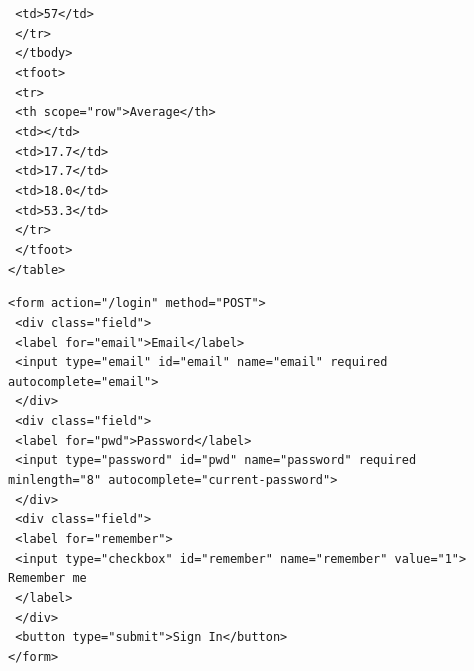 \documentclass[11pt]{article}
\begin{document}
\begin{corrige}[Exercise 4]
\texttt{      <td>57</td>}\\
\texttt{    </tr>}\\
\texttt{  </tbody>}\\
\texttt{  <tfoot>}\\
\texttt{    <tr>}\\
\texttt{      <th scope="row">Average</th>}\\
\texttt{      <td></td>}\\
\texttt{      <td>17.7</td>}\\
\texttt{      <td>17.7</td>}\\
\texttt{      <td>18.0</td>}\\
\texttt{      <td>53.3</td>}\\
\texttt{    </tr>}\\
\texttt{  </tfoot>}\\
\texttt{</table>}
\end{corrige}

\begin{corrige}[Exercise 5]
\texttt{<form action="/login" method="POST">}\\
\texttt{  <div class="field">}\\
\texttt{    <label for="email">Email</label>}\\
\texttt{    <input type="email" id="email" name="email" required autocomplete="email">}\\
\texttt{  </div>}\\
\texttt{  <div class="field">}\\
\texttt{    <label for="pwd">Password</label>}\\
\texttt{    <input type="password" id="pwd" name="password" required minlength="8" autocomplete="current-password">}\\
\texttt{  </div>}\\
\texttt{  <div class="field">}\\
\texttt{    <label for="remember">}\\
\texttt{      <input type="checkbox" id="remember" name="remember" value="1"> Remember me}\\
\texttt{    </label>}\\
\texttt{  </div>}\\
\texttt{  <button type="submit">Sign In</button>}\\
\texttt{</form>}
\end{corrige}
\end{document}
